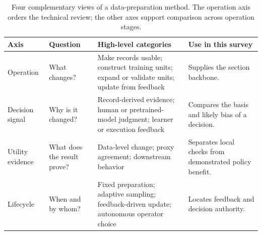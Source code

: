 \begin{table}[t]
\centering
\caption{Four complementary views of a data-preparation method. The operation axis orders the technical review; the other axes support comparison across operation stages.}
\label{tab:taxonomy-axes}
\small
\setlength{\tabcolsep}{5pt}
\begin{tabularx}{\textwidth}{@{}p{2.7cm}p{3.3cm}p{5.0cm}X@{}}
\toprule
Axis & Question & High-level categories & Use in this survey \\
\midrule
Operation
& What changes?
& Make records usable; construct training units; expand or validate units; update from feedback
& Supplies the section backbone. \\
Decision signal
& Why is it changed?
& Record-derived evidence; human or pretrained-model judgment; learner or execution feedback
& Compares the basis and likely bias of a decision. \\
Utility evidence
& What does the result prove?
& Data-level change; proxy agreement; downstream behavior
& Separates local checks from demonstrated policy benefit. \\
Lifecycle
& When and by whom?
& Fixed preparation; adaptive sampling; feedback-driven update; autonomous operator choice
& Locates feedback and decision authority. \\
\bottomrule
\end{tabularx}
\end{table}
